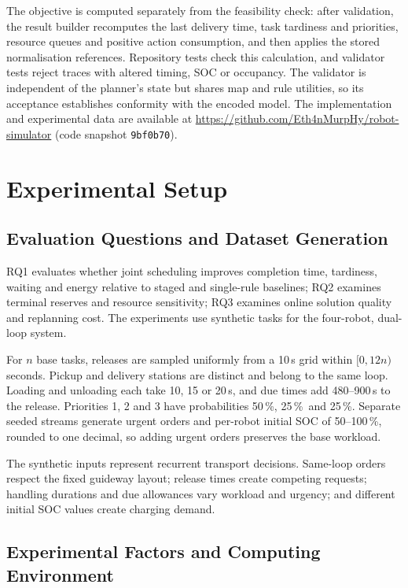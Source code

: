 \documentclass[11pt,a4paper]{article}
\newcommand{\code}[1]{\texttt{#1}}
\newcommand{\pct}{\,\%}
\begin{document}
The objective is computed separately from the feasibility check: after validation, the result builder
recomputes the last delivery time, task tardiness and priorities, resource queues and positive action
consumption, and then applies the stored normalisation references. Repository tests check this
calculation, and validator tests reject traces with altered timing, SOC or occupancy. The validator is independent of the planner's state but shares
map and rule utilities, so its acceptance establishes conformity with the encoded model. The
implementation and experimental data are available at
\url{https://github.com/Eth4nMurpHy/robot-simulator} (code snapshot \code{9bf0b70}).

\section{Experimental Setup}
\label{sec:setup}

\subsection{Evaluation Questions and Dataset Generation}

RQ1 evaluates whether joint scheduling improves completion time, tardiness, waiting and energy
relative to staged and single-rule baselines; RQ2 examines terminal reserves and resource sensitivity;
RQ3 examines online solution quality and replanning cost. The experiments use synthetic tasks for the
four-robot, dual-loop system.

For $n$ base tasks, releases are sampled uniformly from a 10\,s grid within $[0, 12n)$ seconds.
Pickup and delivery stations are distinct and belong to the same loop. Loading and unloading each take
10, 15 or 20\,s, and due times add 480--900\,s to the release. Priorities 1, 2 and 3 have probabilities
50\pct, 25\pct\ and 25\pct. Separate seeded streams generate urgent orders and per-robot initial SOC of
50--100\pct, rounded to one decimal, so adding urgent orders preserves the base workload.

The synthetic inputs represent recurrent transport decisions. Same-loop orders respect the fixed guideway layout; release times create competing requests; handling
durations and due allowances vary workload and urgency; and different initial SOC values create charging
demand.

\subsection{Experimental Factors and Computing Environment}
\end{document}
